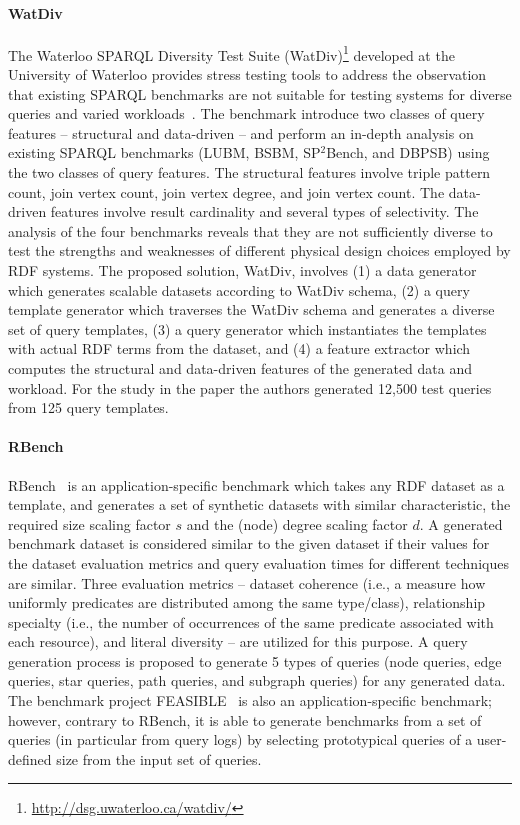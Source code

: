 \paragraph{WatDiv} The Waterloo SPARQL Diversity Test Suite (WatDiv)\footnote{\url{http://dsg.uwaterloo.ca/watdiv/}} developed at the University of Waterloo provides stress testing tools to address the observation that existing SPARQL benchmarks are not suitable for testing systems for diverse queries and varied workloads~\cite{Aluc:2014:DST:2717213.2717229}. The benchmark introduce two classes of query features -- structural and data-driven -- and perform an in-depth analysis on existing SPARQL benchmarks (LUBM, BSBM, SP$^2$Bench, and DBPSB) using the two classes of query features. The structural features involve triple pattern count, join vertex count, join vertex degree, and join vertex count. The data-driven features involve result cardinality and several types of selectivity. The analysis of the four benchmarks reveals that they are not sufficiently diverse to test the strengths and weaknesses of different physical design choices employed by RDF systems. The proposed solution, WatDiv, involves (1) a data generator which generates scalable datasets according to WatDiv schema, (2) a query template generator which traverses the WatDiv schema and generates a diverse set of query templates, (3) a query generator which instantiates the templates with actual RDF terms from the dataset, and (4) a feature extractor which computes the structural and data-driven features of the generated data and workload. For the study in the paper the authors generated 12,500 test queries from 125 query templates.

\paragraph{RBench} RBench~\cite{Qiao:2015:RAR:2723372.2746479} is an application-specific benchmark which takes any RDF dataset as a template, and generates a set of synthetic datasets with similar characteristic, the required size scaling factor $s$ and the (node) degree scaling factor $d$. A generated benchmark dataset is considered similar to the given dataset if their values for the dataset evaluation metrics and query evaluation times for different techniques are similar. Three evaluation metrics -- dataset coherence (i.e., a measure how uniformly predicates are distributed among the same type/class), relationship specialty (i.e., the number of occurrences of the same predicate associated with each resource), and literal diversity -- are utilized for this purpose. A query generation process is proposed to generate 5 types of queries (node queries, edge queries, star queries, path queries, and subgraph queries) for any generated data. The benchmark project FEASIBLE~\cite{Saleem2015} is also an application-specific benchmark; however, contrary to RBench, it is able to generate benchmarks from a set of queries (in particular from query logs) by selecting prototypical queries of a user-defined
size from the input set of queries.


